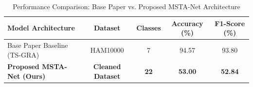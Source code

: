 \begin{table}[htbp]
\caption{Performance Comparison: Base Paper vs. Proposed MSTA-Net Architecture}
\label{tab:performance_comparison}
\begin{center}
\begin{tabular}{|l|c|c|c|c|}
\hline
\textbf{Model Architecture} & \textbf{Dataset} & \textbf{Classes} & \textbf{Accuracy (\%)} & \textbf{F1-Score (\%)} \\
\hline
Base Paper Baseline (TS-GRA) & HAM10000 & 7 & 94.57 & 93.80 \\
\textbf{Proposed MSTA-Net (Ours)} & \textbf{Cleaned Dataset} & \textbf{22} & \textbf{53.00} & \textbf{52.84} \\
\hline
\end{tabular}
\end{center}
\end{table}